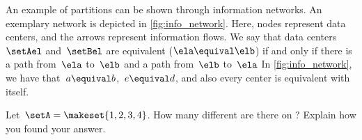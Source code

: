 \begin{example}
    An example of partitions can be shown through information networks.
    An exemplary network is depicted in \cref{fig:info_network}.
    Here, nodes represent data centers, and the arrows represent information flows.
    We say that data centers~$\setAel$ and~$\setBel$ are equivalent ($\ela\equival \elb$) if and only if there is a path from~$\ela$ to~$\elb$ and a path from~$\elb$ to~$\ela$
    In \cref{fig:info_network}, we have that~$a\equival b$,~$e\equival d$, and also every center is equivalent with itself.
\end{example}

\vfill
\begin{gradedexercise}
    \label{ex:CountingEquivalenceRelations}
    Let~$\setA = \makeset{ 1, 2, 3, 4 }$.
    How many different  are there on \setA?
    Explain how you found your answer.
\end{gradedexercise}



